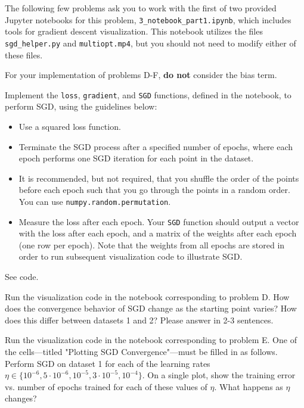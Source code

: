 The following few problems ask you to work with the first of two provided Jupyter notebooks for this problem, \texttt{3_notebook_part1.ipynb}, which includes tools for gradient descent visualization. This notebook utilizes the files \texttt{sgd_helper.py} and \texttt{multiopt.mp4}, but you should not need to modify either of these files. 

For your implementation of problems D-F, \textbf{do not} consider the bias term.

\begin{problem}[6]
  Implement the \texttt{loss}, \texttt{gradient}, and \texttt{SGD} functions, defined in the notebook, to perform SGD, using the guidelines below:

  \begin{itemize}
    \item Use a squared loss function.
    \item Terminate the SGD process after a specified number of epochs, where each epoch performs one SGD iteration for each point in the dataset.
    \item It is recommended, but not required, that you shuffle the order of the points before each epoch such that you go through the points in a random order. You can use \texttt{numpy.random.permutation}.
    \item Measure the loss after each epoch. Your \texttt{SGD} function should output a vector with the loss after each epoch, and a matrix of the weights after each epoch (one row per epoch). Note that the weights from all epochs are stored in order to run subsequent visualization code to illustrate SGD.
  \end{itemize}
\end{problem}
\begin{solution}
See code. %
\end{solution}

\begin{problem}[2]
  Run the visualization code in the notebook corresponding to problem D. How does the convergence behavior of SGD change as the starting point varies? How does this differ between datasets 1 and 2? Please answer in 2-3 sentences.
\end{problem}
\begin{solution}
  
\end{solution}

\begin{problem}[6]
  Run the visualization code in the notebook corresponding to problem E. One of the cells---titled "Plotting SGD Convergence"---must be filled in as follows. Perform SGD on dataset 1 for each of the learning rates $\eta \in \{10^{-6}, 5 \cdot 10^{-6}, 10^{-5}, 3 \cdot 10^{-5}, 10^{-4}\}$. On a single plot, show the training error vs. number of epochs trained for each of these values of $\eta$. What happens as $\eta$ changes?
\end{problem}


